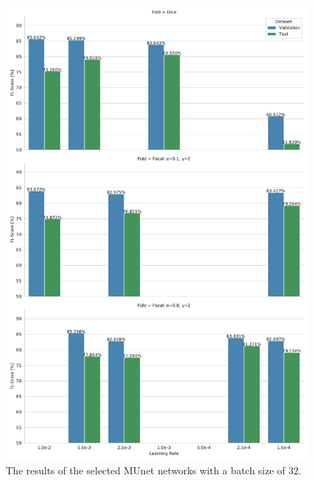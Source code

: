 \begin{figure}
\begin{center}
    \includegraphics[height=\textheight]{imgs/munet_folds_bs32.pdf}
    \caption{The results of the selected \ac{MUnet} networks with a batch size of 32.}
    \label{fig:munet_fold_32}
\end{center}
\end{figure}

